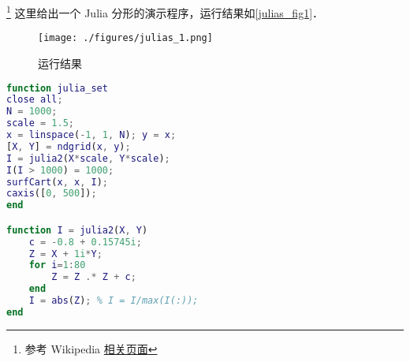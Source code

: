 
\begin{issues}
\issueDraft
\issueMissDepend
\end{issues}

\footnote{参考 Wikipedia \href{https://en.wikipedia.org/wiki/Julia_set}{相关页面}} 这里给出一个 Julia 分形的演示程序，运行结果如\autoref{julias_fig1}．


\begin{figure}[ht]
\centering
\texttt{[image: ./figures/julias\_1.png]}
\caption{运行结果} \label{julias_fig1}
\end{figure}

\begin{lstlisting}[language=matlab, caption=julia\_set.m]
function julia_set
close all;
N = 1000;
scale = 1.5;
x = linspace(-1, 1, N); y = x;
[X, Y] = ndgrid(x, y);
I = julia2(X*scale, Y*scale);
I(I > 1000) = 1000;
surfCart(x, x, I);
caxis([0, 500]);
end

function I = julia2(X, Y)
    c = -0.8 + 0.15745i;
    Z = X + 1i*Y;
    for i=1:80
        Z = Z .* Z + c;
    end
    I = abs(Z); % I = I/max(I(:));
end
\end{lstlisting}
